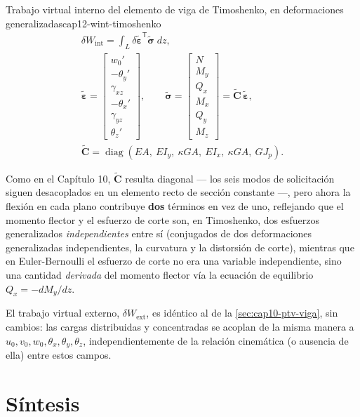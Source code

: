 \begin{ecnimportante}{Trabajo virtual interno del elemento de viga de Timoshenko, en deformaciones generalizadas}{cap12-wint-timoshenko}
\[
\begin{gathered}
\delta W_{\text{int}} = \int_L \delta\tilde{\bm\varepsilon}^{\mathsf T}\tilde{\bm\sigma}\;dz , \\[6pt]
\tilde{\bm\varepsilon} = \begin{bmatrix} w_0' \\ -\theta_y' \\ \gamma_{xz} \\ -\theta_x' \\ \gamma_{yz} \\ \theta_z' \end{bmatrix}, \qquad
\tilde{\bm\sigma} = \begin{bmatrix} N \\ M_y \\ Q_x \\ M_x \\ Q_y \\ M_z \end{bmatrix} = \tilde{\bm C}\,\tilde{\bm\varepsilon}, \\[6pt]
\tilde{\bm C} = \operatorname{diag}\!\left(EA,\ EI_y,\ \kappa GA,\ EI_x,\ \kappa GA,\ GJ_p\right) .
\end{gathered}
\]
\end{ecnimportante}

Como en el Capítulo 10, $\tilde{\bm C}$ resulta diagonal --- los seis modos de solicitación siguen desacoplados en un elemento recto de sección constante ---, pero ahora la flexión en cada plano contribuye \textbf{dos} términos en vez de uno, reflejando que el momento flector y el esfuerzo de corte son, en Timoshenko, dos esfuerzos generalizados \emph{independientes} entre sí (conjugados de dos deformaciones generalizadas independientes, la curvatura y la distorsión de corte), mientras que en Euler-Bernoulli el esfuerzo de corte no era una variable independiente, sino una cantidad \emph{derivada} del momento flector vía la ecuación de equilibrio $Q_x=-dM_y/dz$.

El trabajo virtual externo, $\delta W_{\text{ext}}$, es idéntico al de la \cref{sec:cap10-ptv-viga}, sin cambios: las cargas distribuidas y concentradas se acoplan de la misma manera a $u_0,v_0,w_0,\theta_x,\theta_y,\theta_z$, independientemente de la relación cinemática (o ausencia de ella) entre estos campos.

\section{Síntesis}

